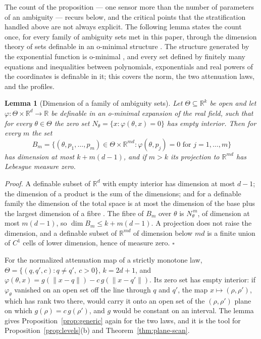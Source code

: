 \documentclass{article}
\newtheorem{lemma}{\bf Lemma}
\begin{document}
The count of the proposition --- one sensor more than the number of parameters of an ambiguity --- recurs below, and the critical points that the stratification handled above are not always explicit. The following lemma states the count once, for every family of ambiguity sets met in this paper, through the dimension theory of sets definable in an o-minimal structure \cite{ref-vdDries}. The structure generated by the exponential function is o-minimal \cite{ref-Wilkie}, and every set defined by finitely many equations and inequalities between polynomials, exponentials and real powers of the coordinates is definable in it; this covers the norm, the two attenuation laws, and the profiles.

\begin{lemma}[Dimension of a family of ambiguity sets] \label{lem:dimension}
Let $\Theta \subseteq \mathbb{R}^{k}$ be open and let $\varphi : \Theta \times \mathbb{R}^{d} \to \mathbb{R}$ be definable in an o-minimal expansion of the real field, such that for every $\theta \in \Theta$ the zero set $N_\theta = \{x : \varphi(\theta, x) = 0\}$ has empty interior. Then for every $m$ the set
\[
B_m = \{ (\theta, p_1, \dots, p_m) \in \Theta \times \mathbb{R}^{md} : \varphi(\theta, p_j) = 0 \text{ for } j = 1, \dots, m \}
\]
has dimension at most $k + m(d - 1)$, and if $m > k$ its projection to $\mathbb{R}^{md}$ has Lebesgue measure zero.
\end{lemma}

\textit{Proof.} A definable subset of $\mathbb{R}^{d}$ with empty interior has dimension at most $d - 1$; the dimension of a product is the sum of the dimensions; and for a definable family the dimension of the total space is at most the dimension of the base plus the largest dimension of a fibre \cite[Ch.~4]{ref-vdDries}. The fibre of $B_m$ over $\theta$ is $N_\theta^{\,m}$, of dimension at most $m(d - 1)$, so $\dim B_m \le k + m(d - 1)$. A projection does not raise the dimension, and a definable subset of $\mathbb{R}^{md}$ of dimension below $md$ is a finite union of $C^{1}$ cells of lower dimension, hence of measure zero. $\square$

For the normalized attenuation map of a strictly monotone law, $\Theta = \{(q, q', c) : q \ne q',\ c > 0\}$, $k = 2d + 1$, and $\varphi(\theta, x) = g(\lVert x - q \rVert) - c\, g(\lVert x - q' \rVert)$. Its zero set has empty interior: if $\varphi_\theta$ vanished on an open set off the line through $q$ and $q'$, the map $x \mapsto (\rho, \rho')$, which has rank two there, would carry it onto an open set of the $(\rho, \rho')$ plane on which $g(\rho) = c\,g(\rho')$, and $g$ would be constant on an interval. The lemma gives Proposition~\ref{prop:generic} again for the two laws, and it is the tool for Proposition~\ref{prop:levels}(b) and Theorem~\ref{thm:plane-scan}.
\end{document}
